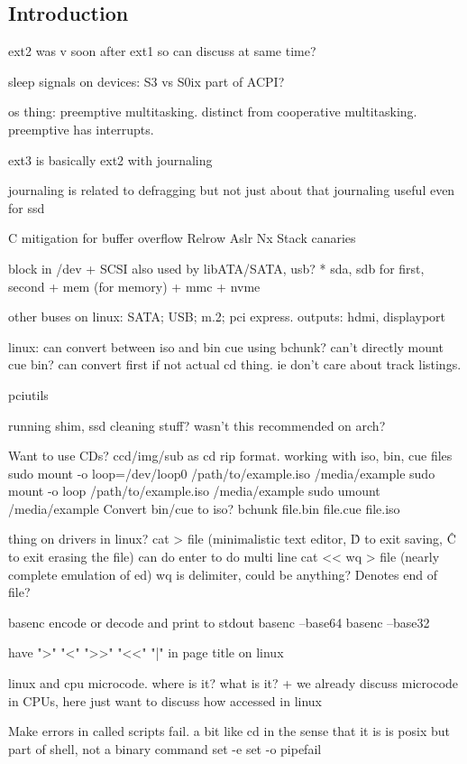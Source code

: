 
\subsection{Introduction}

ext2 was v soon after ext1 so can discuss at same time?

sleep signals on devices: S3 vs S0ix
		part of ACPI?


os thing: preemptive multitasking. distinct from cooperative multitasking. preemptive has interrupts.

ext3 is basically ext2 with journaling

journaling is related to defragging but not just about that
	journaling useful even for ssd

C mitigation for buffer overflow
Relrow
Aslr
Nx
Stack canaries

block in /dev
+ SCSI also used by libATA/SATA, usb?
  * sda, sdb for first, second
+ mem (for memory)
+ mmc
+ nvme

other buses on linux: SATA; USB; m.2; pci express. outputs: hdmi, displayport

linux: can convert between iso and bin cue using bchunk?
can't directly mount cue bin? can convert first if not actual cd thing. ie don't care about track listings.

pciutils

running shim, ssd cleaning stuff? wasn't this recommended on arch?

Want to use CDs?
ccd/img/sub as cd rip format.
working with iso, bin, cue files
sudo mount -o loop=/dev/loop0 /path/to/example.iso /media/example
sudo mount -o loop /path/to/example.iso /media/example
sudo umount /media/example
Convert bin/cue to iso?
bchunk file.bin file.cue file.iso


thing on drivers in linux?
    cat > file                (minimalistic text editor, \^D to exit saving, \^C to exit erasing the file)
	can do enter to do multi line
    cat << wq > file          (nearly complete emulation of ed)
	wq is delimiter, could be anything? Denotes end of file?

basenc
	encode or decode and print to stdout
		basenc --base64
		basenc --base32

have ">" "<" ">>" "<<" "|" in page title on linux

linux and cpu microcode. where is it? what is it?
+ we already discuss microcode in CPUs, here just want to discuss how accessed in linux

Make errors in called scripts fail.
a bit like cd in the sense that it is is posix but part of shell, not a binary command
set -e
set -o pipefail

